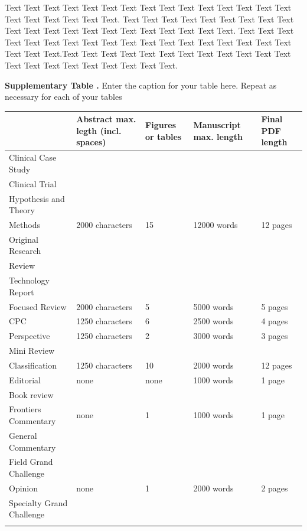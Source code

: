\documentclass{frontiersSCNSsuppmat} %
\begin{document}
Text Text Text Text Text Text  Text Text Text Text Text Text Text Text Text  Text Text Text Text Text Text. Text Text Text Text Text Text  Text Text Text Text Text Text Text Text Text  Text Text Text Text Text Text. Text Text Text Text Text Text  Text Text Text Text Text Text Text Text Text  Text Text Text Text Text Text.Text Text Text Text Text Text  Text Text Text Text Text Text Text Text Text  Text Text Text Text Text Text.

\begin{table}[!t]
\textbf{\label{Tab:01} Supplementary Table .}{ Enter the caption for your table here.  Repeat as  necessary for each of your tables }

\processtable{ }
{\begin{tabular}{lllll}\toprule
 & Abstract max. legth (incl. spaces) & Figures or tables & Manuscript max. length & Final PDF length\\\midrule
Clinical Case Study & & & &\\
Clinical Trial & & & &\\
Hypothesis and Theory & & & &\\
Methods & 2000 characters  & 15 & 12000 words & 12 pages\\
Original Research & & & &\\
Review & & & &\\
Technology Report & & & &\\
Focused Review & 2000 characters & 5 & 5000 words & 5 pages\\
CPC &  1250 characters& 6 & 2500 words & 4 pages\\
Perspective & 1250 characters & 2 & 3000 words & 3 pages\\
Mini Review & & & &\\
Classification & 1250 characters & 10 & 2000 words & 12 pages\\
Editorial & none & none & 1000 words & 1 page \\
Book review & & & &\\
Frontiers Commentary & none & 1 & 1000 words & 1 page\\
General Commentary & & & &\\
Field Grand Challenge & & & &\\
Opinion & none & 1 & 2000 words & 2 pages\\
Specialty Grand Challenge& & & &\\\botrule
\end{tabular}}{}
\end{table}
\end{document}
